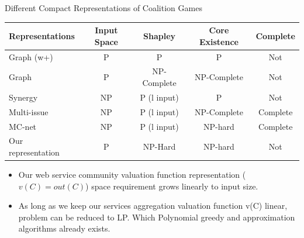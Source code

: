 \documentclass{beamer}
\begin{document}
\begin{frame}{Different Compact Representations of Coalition Games}
    
    \begin{table}
        \footnotesize
        \begin{tabular}{l|c|c|c|c}
        Representations                  & Input Space    & Shapley                  & Core Existence  & Complete     \\ \hline
        Graph (w+)                       & P        & P                        & P               & Not          \\
        Graph                            & P        & NP-Complete              & NP-Complete     & Not          \\
        Synergy                          & NP       & P (l input)              & P               & Not          \\
        Multi-issue                      & NP       & P (l input)              & NP-Complete     & Complete     \\
        MC-net                           & NP       & P (l input)              & NP-hard         & Complete     \\
        Our representation               & P        & NP-Hard                  & NP-hard         & Not          \\
        \end{tabular}
    \end{table}

    \begin{itemize}
        \item Our web service community valuation function representation ($v(C) = out(C)$) space requirement grows linearly to input size.
        \item As long as we keep our services aggregation valuation function v(C) linear, problem can be reduced to LP. Which Polynomial greedy and approximation algorithms already exists.
    \end{itemize}

\end{frame}


\end{document}
